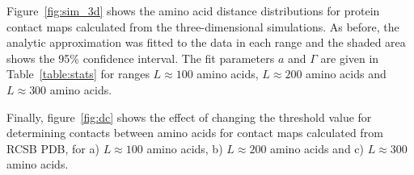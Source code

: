 \documentclass[10pt]{iopart}
\begin{document}
Figure~\ref{fig:sim_3d} shows the amino acid distance distributions for protein contact maps calculated from the three-dimensional simulations. As before, the analytic approximation was fitted to the data in each range and the shaded area shows the 95\% confidence interval. The fit parameters $a$ and $\Gamma$ are given in Table~\ref{table:stats} for ranges $L\approx100$ amino acids,  $L\approx200$ amino acids and $L\approx300$ amino acids.

Finally, figure~\ref{fig:dc} shows the effect of changing the threshold value for determining contacts between amino acids for contact maps calculated from RCSB PDB, for a)  $L\approx100$ amino acids,  b) $L\approx200$ amino acids and c) $L\approx300$ amino acids.

\end{document}
